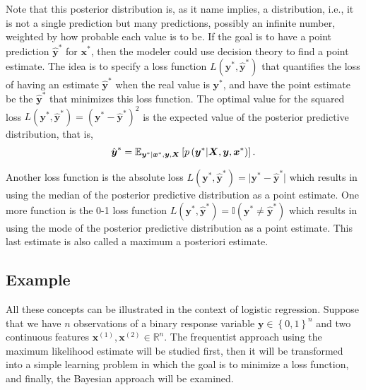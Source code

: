 Note that this posterior distribution is, as it name implies, a distribution, i.e., it is not a single prediction but many predictions, possibly an infinite number, weighted by how probable each value is to be. If the goal is to have a point prediction $\hat{\boldsymbol{y}}^*$ for $\boldsymbol{x}^*$, then the modeler could use decision theory to find a point estimate. The idea is to specify a loss function $L(\boldsymbol{y}^*, \hat{\boldsymbol{y}}^*)$ that quantifies the loss of having an estimate $\hat{\boldsymbol{y}}^*$ when the real value is $\boldsymbol{y}^*$, and have the point estimate be the $\hat{\boldsymbol{y}}^*$ that minimizes this loss function. The optimal value for the squared loss $L(\boldsymbol{y}^*, \hat{\boldsymbol{y}}^*) = (\boldsymbol{y}^* - \hat{\boldsymbol{y}}^*)^2$ is the expected value of the posterior predictive distribution, that is,
\begin{equation}
  \hat{\boldsymbol{y}}^* = \mathbb{E}_{\boldsymbol{y}^* | \boldsymbol{x}^*, \boldsymbol{y}, \boldsymbol{X}} \left[ p\left( \boldsymbol{y}^* | \boldsymbol{X}, \boldsymbol{y}, \boldsymbol{x}^* \right) \right].
\end{equation}

Another loss function is the absolute loss $L(\boldsymbol{y}^*, \hat{\boldsymbol{y}}^*) = \vert \boldsymbol{y}^* - \hat{\boldsymbol{y}}^* \vert$ which results in using the median of the posterior predictive distribution as a point estimate. One more function is the 0-1 loss function $L(\boldsymbol{y}^*, \hat{\boldsymbol{y}}^*) = \mathbb{I}(\boldsymbol{y}^* \neq \hat{\boldsymbol{y}}^* )$ which results in using the mode of the posterior predictive distribution as a point estimate. This last estimate is also called a maximum a posteriori estimate.

\subsection{Example}

All these concepts can be illustrated in the context of logistic regression. Suppose that we have $n$ observations of a binary response variable $\boldsymbol{y} \in \left\{0, 1\right\}^n$ and two continuous features $\boldsymbol{x}^{(1)}, \boldsymbol{x}^{(2)} \in \mathbb{R}^n$. The frequentist approach using the maximum likelihood estimate will be studied first, then it will be transformed into a simple learning problem in which the goal is to minimize a loss function, and finally, the Bayesian approach will be examined.


